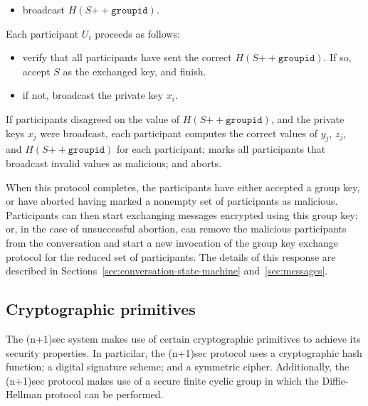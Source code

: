 \documentclass{article}
\def\concat{\mathbin{+\!\!\!+}}
\begin{document}
\begin{description}[noitemsep]
\begin{itemize}[noitemsep,nolistsep]
	\item broadcast $H(S \concat \texttt{groupid})$.
	\end{itemize}
\item[Round 4.] Each participant $U_i$ proceeds as follows:
	\begin{itemize}[noitemsep,nolistsep]\renewcommand{\labelitemi}{--}
	\item verify that all participants have sent the correct $H(S \concat \texttt{groupid})$. If so, accept $S$ as the exchanged key, and finish.
	\item if not, broadcast the private key $x_i$.
	\end{itemize}
\item[Aftermath.] If participants disagreed on the value of $H(S \concat \texttt{groupid})$, and the private keys $x_j$ were broadcast, each participant computes the correct values of $y_j$, $z_j$, and $H(S \concat \texttt{groupid})$ for each participant; marks all participants that broadcast invalid values as malicious; and aborts.
\end{description}

When this protocol completes, the participants have either accepted a group key, or have aborted having marked a nonempty set of participants as malicious.
Participants can then start exchanging messages encrypted using this group key; or, in the case of unsuccessful abortion, can remove the malicious participants from the conversation and start a new invocation of the group key exchange protocol for the reduced set of participants.
The details of this response are described in Sections~\ref{sec:conversation-state-machine} and~\ref{sec:messages}.



\subsection{Cryptographic primitives}
\label{sec:cryptography/cryptographic-primitives}

The (n+1)sec system makes use of certain cryptographic primitives to achieve its security properties.
In particilar, the (n+1)sec protocol uses a cryptographic hash function; a digital signature scheme; and a symmetric cipher.
Additionally, the (n+1)sec protocol makes use of a secure finite cyclic group in which the Diffie-Hellman protocol can be performed.
\end{document}
